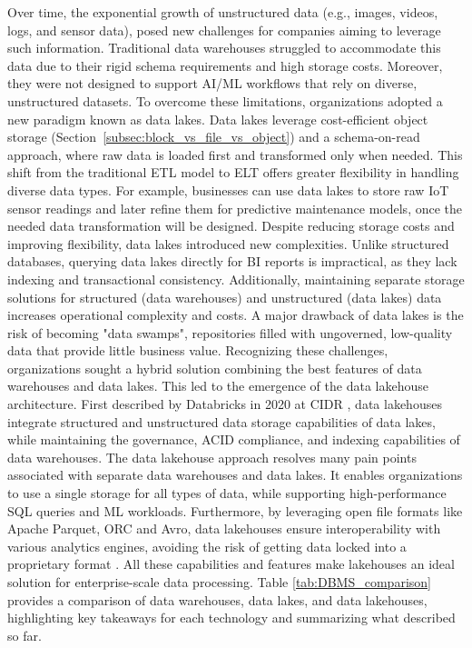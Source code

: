 Over time, the exponential growth of unstructured data (e.g., images, videos, logs, and sensor data), posed new challenges for companies aiming to leverage such information. Traditional data warehouses struggled to accommodate this data due to their rigid schema requirements and high storage costs. Moreover, they were not designed to support \gls{AI}/\gls{ML} workflows that rely on diverse, unstructured datasets. To overcome these limitations, organizations adopted a new paradigm known as data lakes. Data lakes leverage cost-efficient object storage (Section~\ref{subsec:block_vs_file_vs_object}) and a schema-on-read approach, where raw data is loaded first and transformed only when needed. This shift from the traditional \gls{ETL} model to \gls{ELT} offers greater flexibility in handling diverse data types. For example, businesses can use data lakes to store raw IoT sensor readings and later refine them for predictive maintenance models, once the needed data transformation will be designed. Despite reducing storage costs and improving flexibility, data lakes introduced new complexities. Unlike structured databases, querying data lakes directly for \gls{BI} reports is impractical, as they lack indexing and transactional consistency. Additionally, maintaining separate storage solutions for structured (data warehouses) and unstructured (data lakes) data increases operational complexity and costs. A major drawback of data lakes is the risk of becoming "data swamps", repositories filled with ungoverned, low-quality data that provide little business value. Recognizing these challenges, organizations sought a hybrid solution combining the best features of data warehouses and data lakes. This led to the emergence of the data lakehouse architecture. First described by Databricks in 2020 at \gls{CIDR} \cite{lakehouse2021}, data lakehouses integrate structured and unstructured data storage capabilities of data lakes, while maintaining the governance, \gls{ACID} compliance, and indexing capabilities of data warehouses. The data lakehouse approach resolves many pain points associated with separate data warehouses and data lakes. It enables organizations to use a single storage for all types of data, while supporting high-performance \gls{SQL} queries and \gls{ML} workloads. Furthermore, by leveraging open file formats like Apache Parquet, ORC and Avro, data lakehouses ensure interoperability with various analytics engines, avoiding the risk of getting data locked into a proprietary format \cite{mazumdarDataLakehouseData2023}. All these capabilities and features make lakehouses an ideal solution for enterprise-scale data processing. Table \ref{tab:DBMS_comparison} provides a comparison of data warehouses, data lakes, and data lakehouses, highlighting key takeaways for each technology and summarizing what described so far.

